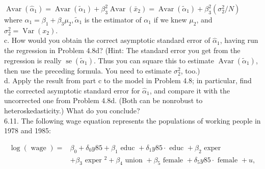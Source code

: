 \documentclass[10pt]{article}
\begin{document}
$\operatorname{Avar}\left(\hat{\alpha}_{1}\right)=\operatorname{Avar}\left(\tilde{\alpha}_{1}\right)+\beta_{3}^{2} \operatorname{Avar}\left(\bar{x}_{2}\right)=\operatorname{Avar}\left(\tilde{\alpha}_{1}\right)+\beta_{3}^{2}\left(\sigma_{2}^{2} / N\right)$\\
where $\alpha_{1}=\beta_{1}+\beta_{3} \mu_{2}, \tilde{\alpha}_{1}$ is the estimator of $\alpha_{1}$ if we knew $\mu_{2}$, and $\sigma_{2}^{2}=\operatorname{Var}\left(x_{2}\right)$.\\
c. How would you obtain the correct asymptotic standard error of $\hat{\alpha}_{1}$, having run the regression in Problem 4.8d? (Hint: The standard error you get from the regression is really $\operatorname{se}\left(\tilde{\alpha}_{1}\right)$. Thus you can square this to estimate $\operatorname{Avar}\left(\tilde{\alpha}_{1}\right)$, then use the preceding formula. You need to estimate $\sigma_{2}^{2}$, too.)\\
d. Apply the result from part c to the model in Problem 4.8; in particular, find the corrected asymptotic standard error for $\hat{\alpha}_{1}$, and compare it with the uncorrected one from Problem 4.8d. (Both can be nonrobust to heteroskedasticity.) What do you conclude?\\
6.11. The following wage equation represents the populations of working people in 1978 and 1985:

$$
\begin{aligned}
\log (\text { wage })= & \beta_{0}+\delta_{0} y 85+\beta_{1} \text { educ }+\delta_{1} y 85 \cdot \text { educ }+\beta_{2} \text { exper } \\
& +\beta_{3} \text { exper }^{2}+\beta_{4} \text { union }+\beta_{5} \text { female }+\delta_{5} y 85 \cdot \text { female }+u,
\end{aligned}
$$
\end{document}

